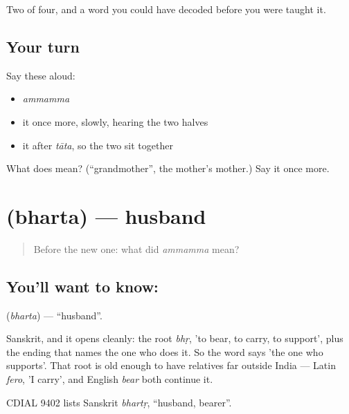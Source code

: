 \begin{grammarlens}[title={What you've built}]
Two of four, and a word you could have decoded before you were taught it.
\end{grammarlens}

\subsection*{Your turn}
Say these aloud:

\begin{itemize}
\raggedright
  \item \emph{ammamma}
  \item it once more, slowly, hearing the two halves
  \item it after \emph{tāta}, so the two sit together
\end{itemize}

\begin{tcolorbox}[breakable,colback=teal!4,colframe=teal!35!black,title={Before you move on}]
What does  mean? (\textquotedblleft{}grandmother\textquotedblright{}, the mother's mother.) Say it once more.
\end{tcolorbox}
\section[\texorpdfstring{\te{భర్త} (bharta)}{భర్త (bharta)}]{ (bharta) — husband}

\label{lesson:TE-C45-husband}



\begin{quote}
Before the new one: what did \emph{ammamma} mean?
\end{quote}

\subsection*{You'll want to know: }
\textbf{} (\emph{bharta}) — \textquotedblleft{}husband\textquotedblright{}.

Sanskrit, and it opens cleanly: the root \emph{bhṛ}, 'to bear, to carry, to support', plus the ending that names the one who does it. So the word says 'the one who supports'. That root is old enough to have relatives far outside India — Latin \emph{fero}, 'I carry', and English \emph{bear} both continue it.

CDIAL 9402 lists Sanskrit \emph{bhartṛ}, \textquotedblleft{}husband, bearer\textquotedblright{}.

